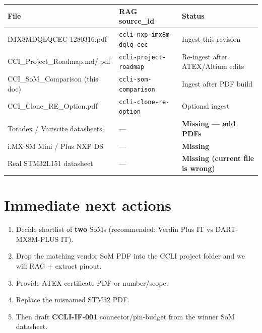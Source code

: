 \documentclass[10pt,a4paper]{article}
\begin{document}
\begin{tabularx}{\linewidth}{@{}>{\raggedright\arraybackslash}p{4.2cm}l>{\RaggedRight\arraybackslash}X@{}}
\toprule
\textbf{File} & \textbf{RAG source\_id} & \textbf{Status} \\
\midrule
IMX8MDQLQCEC-1280316.pdf & \texttt{ccli-nxp-imx8m-dqlq-cec} & Ingest this revision \\
CCI\_Project\_Roadmap.md/.pdf & \texttt{ccli-project-roadmap} & Re-ingest after ATEX/Altium edits \\
CCI\_SoM\_Comparison (this doc) & \texttt{ccli-som-comparison} & Ingest after PDF build \\
CCI\_Clone\_RE\_Option.pdf & \texttt{ccli-clone-re-option} & Optional ingest \\
Toradex / Variscite datasheets & --- & \textbf{Missing --- add PDFs} \\
i.MX 8M Mini / Plus NXP DS & --- & \textbf{Missing} \\
Real STM32L151 datasheet & --- & \textbf{Missing (current file is wrong)} \\
\bottomrule
\end{tabularx}

\section{Immediate next actions}

\begin{enumerate}[leftmargin=*]
  \item Decide shortlist of \textbf{two} SoMs (recommended: Verdin Plus IT vs DART-MX8M-PLUS IT).
  \item Drop the matching vendor SoM PDF into the CCLI project folder and we will RAG + extract pinout.
  \item Provide ATEX certificate PDF or number/scope.
  \item Replace the misnamed STM32 PDF.
  \item Then draft \textbf{CCLI-IF-001} connector/pin-budget from the winner SoM datasheet.
\end{enumerate}
\end{document}
